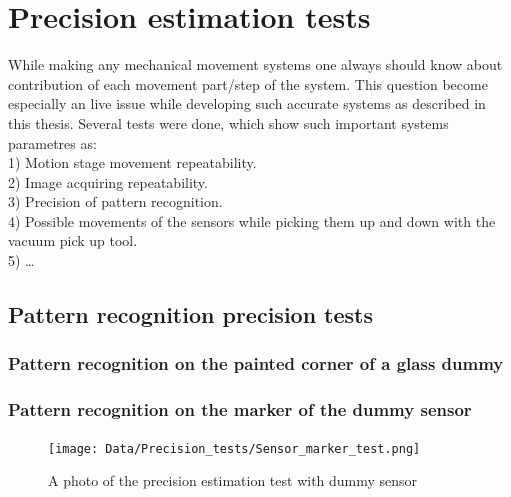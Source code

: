 \chapter{Precision estimation tests}

While making any mechanical movement systems one always should know about contribution of each movement part/step of the system. This question become especially an live issue while developing such accurate systems as described in this thesis. Several tests were done, which show such important systems parametres as:\\
1) Motion stage movement repeatability.\\
2) Image acquiring repeatability.\\
3) Precision of pattern recognition.\\
4) Possible movements of the sensors while picking them up and down with the vacuum pick up tool.\\
5) \ldots

\section{Pattern recognition precision tests}
\subsection{Pattern recognition on the painted corner of a glass dummy}

\subsection{Pattern recognition on the marker of the dummy sensor}

\begin{figure}[ht]\centering
\texttt{[image: Data/Precision\_tests/Sensor\_marker\_test.png]}
\caption{A photo of the precision estimation test with dummy sensor}
\label{fig:sensor_marker_test}
\end{figure}

